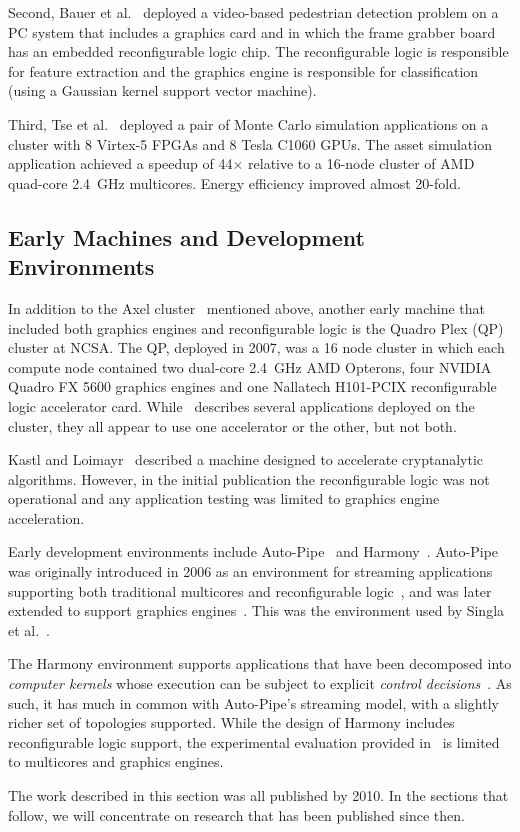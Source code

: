Second, Bauer et al.~\cite{bkdb10} deployed a video-based pedestrian
detection problem on a PC system that includes a graphics card and
in which the frame grabber board has an embedded reconfigurable logic chip.
The reconfigurable logic is responsible for feature extraction and the
graphics engine is responsible for classification (using a Gaussian
kernel support vector machine).

Third, Tse et al.~\cite{tttl10} deployed a pair of Monte Carlo simulation
applications on a cluster with 8 Virtex-5 FPGAs and 8 Tesla C1060 GPUs.
The asset simulation application achieved a speedup of 44$\times$ relative
to a 16-node cluster of AMD quad-core 2.4~GHz multicores.  Energy efficiency
improved almost 20-fold.

\subsection{Early Machines and Development Environments}

In addition to the Axel cluster~\cite{tl10} mentioned above, another
early machine that included both graphics engines and reconfigurable
logic is the Quadro Plex (QP)~\cite{sep+09} cluster at NCSA.
The QP, deployed in 2007,
was a 16 node cluster in which each compute node contained two
dual-core 2.4~GHz AMD Opterons, four NVIDIA Quadro FX 5600 graphics
engines and one Nallatech H101-PCIX reconfigurable logic accelerator card.
While~\cite{sep+09} describes several applications deployed on the cluster,
they all appear to use one accelerator or the other, but not both.

Kastl and Loimayr~\cite{kl10} described a machine designed to accelerate
cryptanalytic algorithms.  However, in the initial publication the
reconfigurable logic was not operational and any application testing
was limited to graphics engine acceleration.

Early development environments include Auto-Pipe~\cite{ftb+06,cft+10}
and Harmony~\cite{dy08}.  Auto-Pipe was originally introduced in 2006
as an environment for streaming applications supporting both traditional
multicores and reconfigurable logic~\cite{ftb+06}, and was later extended
to support graphics engines~\cite{cft+10}. This was the environment
used by Singla et al.~\cite{shsc08}.

The Harmony environment supports applications that have been decomposed into
\emph{computer kernels} whose execution can be subject to explicit
\emph{control decisions}~\cite{dy08}.
As such, it has much in common with Auto-Pipe's
streaming model, with a slightly richer set of topologies supported.
While the design of Harmony includes reconfigurable logic support, the
experimental evaluation provided in~\cite{dy08} is limited to multicores
and graphics engines.

The work described in this section was all published by 2010. In the
sections that follow, we will concentrate on research that has been
published since then.
